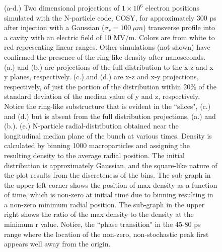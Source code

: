 \documentclass[aps,prl,twocolumn,showpacs,superscriptaddress,groupedaddress]{revtex4-1}  %
\begin{document}
{\begin{figure}
\begin{tabular}{ccc}
  \end{tabular}
\caption{\label{fig:distribution substructure} (a-d.) Two dimensional projections of $1 \times 10^6$ electron positions
simulated with the N-particle code, COSY, for approximately 300 ps after injection with a Gaussian 
($\sigma_r = 100 ~\mu m$) transverse profile into
a cavity with an electric field of 10 MV/m.  Colors are
from white to red representing linear ranges.  Other
simulations (not shown) have confirmed the presence of the ring-like density after nanoseconds.
(a.)  and (b.) are projections
of the full distribution to the x-z and x-y planes, respectively.  (c.) and (d.) are x-z and x-y
projections, respectively, of just the portion of the
distribution within 20\% of the standard deviation of the median value of y and z, respectively.  Notice
the ring-like substructure that is evident in the ``slices", (c.) and (d.) but is absent from the full distribution
projections, (a.) and (b.). (e.) N-particle radial-distribution obtained near the longitudinal median plane of the bunch at various times.
Density is calculated by binning 1000 macroparticles and assigning the resulting density to the average radial position.  The 
initial distribution is approximately Gaussian, and the square-like nature of the plot results from the discreteness of the bins.   
The sub-graph in the upper left corner shows 
the position of max density as a function of time, which is non-zero at initial time due to binning resulting in a non-zero minimum radial position. 
The sub-graph in the upper right shows the ratio of the
max density to the density at the minimum r value.  Notice, the ``phase transition" in the 45-80 ps range where the 
location of the non-zero, non-stochastic peak first appears well away from the origin. 
}
\end{figure} 

}
\end{document}
